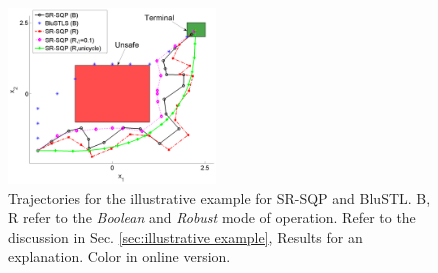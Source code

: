\begin{exmp}
\begin{figure}[t]
\centering
\includegraphics[width=0.49\textwidth]{figures/ToyExUni_scissored.pdf}
\vspace{-20pt}
\caption{{\small Trajectories for the illustrative example for SR-SQP and BluSTL. B, R refer to the \textit{Boolean} and \textit{Robust} mode of operation. Refer to the discussion in Sec. \ref{sec:illustrative example}}, Results for an explanation. Color in online version.}
\label{fig:toy control}
\vspace{-10pt}
\end{figure}

\end{exmp}